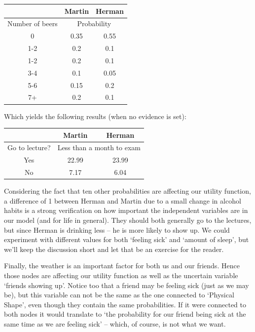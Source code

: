 \documentclass{article}
\begin{document}
\begin{table}[h]
  \centering
  \begin{tabular}{|c|c|c|} \hline
    & Martin & Herman \\ \hline
    Number of beers & \multicolumn{2}{|c|}{Probability} \\ \hline \hline
    0 & 0.35 & 0.55 \\ \hline
    1-2 & 0.2 & 0.1 \\ \hline
    1-2 & 0.2 & 0.1 \\ \hline
    3-4 & 0.1 & 0.05 \\ \hline
    5-6 & 0.15 & 0.2 \\ \hline
    7+ & 0.2 & 0.1 \\ \hline
  \end{tabular}
\end{table}

\newpage
Which yields the following results (when no evidence is set):

\begin{table}[h]
  \centering
  \begin{tabular}{|c|c|c|} \hline
    & Martin & Herman \\ \hline
    Go to lecture? & \multicolumn{2}{|c|}{Less than a month to exam} \\ \hline \hline
    Yes & 22.99 & 23.99 \\ \hline
    No & 7.17 & 6.04 \\ \hline
  \end{tabular}
\end{table}

Considering the fact that ten other probabilities are affecting our utility
function, a difference of 1 between Herman and Martin due to a small change in
alcohol habits is a strong verification on how important the independent
variables are in our model (and for life in general). They should both
generally go to the lectures, but since Herman is drinking less -- he is more
likely to show up. We could experiment with different values for both ‘feeling
sick’ and ‘amount of sleep’, but we’ll keep the discussion short and let that
be an exercise for the reader.

Finally, the weather is an important factor for both us and our friends. Hence
those nodes are affecting our utility function as well as the uncertain
variable ‘friends showing up’. Notice too that a friend may be feeling sick
(just as we may be), but this variable can not be the same as the one connected
to ‘Physical Shape’, even though they contain the same probabilities. If it
were connected to both nodes it would translate to ‘the probability for our
friend being sick at the same time as we are feeling sick’ -- which, of course,
is not what we want.
\end{document}
